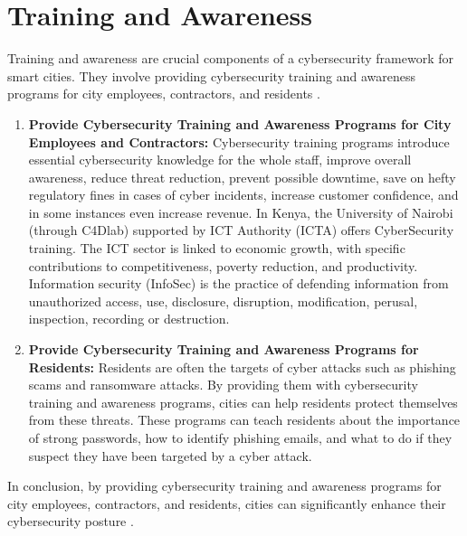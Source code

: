 \documentclass{article}
\begin{document}
\section{Training and Awareness}
Training and awareness are crucial components of a cybersecurity framework for smart cities. They involve providing cybersecurity training and awareness programs for city employees, contractors, and residents\cite{grigas-2023} \cite{ward-2023}\cite{begeny-2023}.
\begin{enumerate}[label=\alph*)]
    \item \textbf{Provide Cybersecurity Training and Awareness Programs for City Employees and Contractors:} Cybersecurity training programs introduce essential cybersecurity knowledge for the whole staff, improve overall awareness, reduce threat reduction, prevent possible downtime, save on hefty regulatory fines in cases of cyber incidents, increase customer confidence, and in some instances even increase revenue\cite{grigas-2023}. In Kenya, the University of Nairobi (through C4Dlab) supported by ICT Authority (ICTA) offers CyberSecurity training\cite{c4dlab-no-date}. The ICT sector is linked to economic growth, with specific contributions to competitiveness, poverty reduction, and productivity\cite{c4dlab-no-date}. Information security (InfoSec) is the practice of defending information from unauthorized access, use, disclosure, disruption, modification, perusal, inspection, recording or destruction\cite{c4dlab-no-date}.
    \item \textbf{Provide Cybersecurity Training and Awareness Programs for Residents:} Residents are often the targets of cyber attacks such as phishing scams and ransomware attacks\cite{ward-2023}. By providing them with cybersecurity training and awareness programs, cities can help residents protect themselves from these threats\cite{ward-2023}. These programs can teach residents about the importance of strong passwords, how to identify phishing emails, and what to do if they suspect they have been targeted by a cyber attack\cite{ward-2023}.

\end{enumerate}

In conclusion, by providing cybersecurity training and awareness programs for city employees, contractors, and residents, cities can significantly enhance their cybersecurity posture\cite{grigas-2023} \cite{ward-2023}\cite{begeny-2023}.
\end{document}
